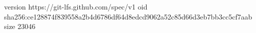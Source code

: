 version https://git-lfs.github.com/spec/v1
oid sha256:ce128874f839558a2b4d6786df64d8edcd9062a52c85d66d3eb7bb3cc5cf7aab
size 23046
